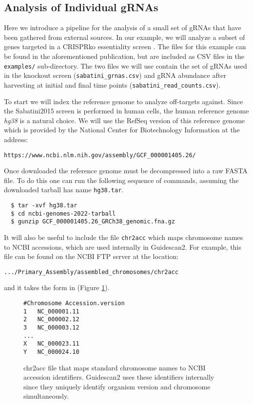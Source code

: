 \documentclass[11pt]{article}
\begin{document}
\subsection{Analysis of Individual gRNAs}
Here we introduce a pipeline for the analysis of a small set of gRNAs
that have been gathered from external sources. In our example, we will
analyze a subset of genes targeted in a CRISPRko essentiality screen
\parencite{Wang1096}.  The files for this example can be found in the
aforementioned publication, but are included as CSV files in the
\texttt{examples/} sub-directory. The two files we will use contain
the set of gRNAs used in the knockout screen
(\texttt{sabatini\_grnas.csv}) and gRNA abundance after harvesting at
initial and final time points (\texttt{sabatini\_read\_counts.csv}).

To start we will index the reference genome to analyze off-targets
against. Since the Sabatini2015 screen is performed in human cells,
the human reference genome \textit{hg38} is a natural choice. We will
use the RefSeq version of this reference genome which is provided by
the National Center for Biotechnology Information at the address:

\begin{center}
\texttt{https://www.ncbi.nlm.nih.gov/assembly/GCF\_000001405.26/}
\end{center}

Once downloaded the reference genome must be decompressed into a raw
FASTA file.  To do this one can run the following sequence of
commands, assuming the downloaded tarball has name \texttt{hg38.tar}.

\begin{verbatim}
  $ tar -xvf hg38.tar
  $ cd ncbi-genomes-2022-tarball
  $ gunzip GCF_000001405.26_GRCh38_genomic.fna.gz
\end{verbatim}

It will also be useful to include the file \texttt{chr2acc} which maps
chromosome names to NCBI accessions, which are used internally in
Guidescan2. For example, this file can be found on the NCBI FTP server
at the location:

\begin{center}
\texttt{.../Primary\_Assembly/assembled\_chromosomes/chr2acc}
\end{center}

and it takes the form in (Figure \ref{fig:chr2acc}).

\begin{figure}[t]
  \centering
  \begin{verbatim}
#Chromosome	Accession.version
1	NC_000001.11
2	NC_000002.12
3	NC_000003.12
...
X	NC_000023.11
Y	NC_000024.10
    \end{verbatim}
    \caption{\label{fig:chr2acc} chr2acc file that maps standard
      chromosome names to NCBI accession identifiers. Guidescan2 uses
      these identifiers internally since they uniquely identify
      organism version and chromosome simultaneously. }
\end{figure}
\end{document}
